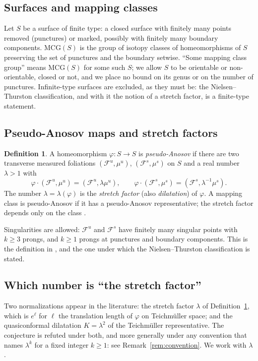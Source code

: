 \documentclass[11pt]{article}
\theoremstyle{plain}
\theoremstyle{definition}
\newtheorem{definition}[theorem]{Definition}
\theoremstyle{remark}
\newcommand{\Fu}{\mathcal{F}^{u}}
\newcommand{\Fs}{\mathcal{F}^{s}}
\begin{document}
\subsection{Surfaces and mapping classes}

Let $S$ be a surface of finite type: a closed surface with finitely many points
removed (punctures) or marked, possibly with finitely many boundary components.
$\mathrm{MCG}(S)$ is the group of isotopy classes of homeomorphisms of $S$
preserving the set of punctures and the boundary setwise. ``Some mapping class
group'' means $\mathrm{MCG}(S)$ for some such $S$; we allow $S$ to be orientable
or non-orientable, closed or not, and we place no bound on its genus or on the
number of punctures. Infinite-type surfaces are excluded, as they must be: the
Nielsen--Thurston classification, and with it the notion of a stretch factor, is a
finite-type statement.

\subsection{Pseudo-Anosov maps and stretch factors}

\begin{definition}\label{def:pa}
A homeomorphism $\varphi\colon S\to S$ is \emph{pseudo-Anosov} if there are two
transverse measured foliations $(\Fu,\mu^{u})$, $(\Fs,\mu^{s})$ on $S$ and a real
number $\lambda>1$ with
\[
  \varphi\cdot(\Fu,\mu^{u})=(\Fu,\lambda\mu^{u}),
  \qquad
  \varphi\cdot(\Fs,\mu^{s})=(\Fs,\lambda^{-1}\mu^{s}).
\]
The number $\lambda=\lambda(\varphi)$ is the \emph{stretch factor} (also
\emph{dilatation}) of $\varphi$. A mapping class is pseudo-Anosov if it has a
pseudo-Anosov representative; the stretch factor depends only on the class
\cite{FLP,FM}.
\end{definition}

Singularities are allowed: $\Fu$ and $\Fs$ have finitely many singular points with
$k\ge3$ prongs, and $k\ge1$ prongs at punctures and boundary components. This is
the definition in \cite{FLP,FM,Thurston88}, and the one under which the
Nielsen--Thurston classification is stated.

\subsection{Which number is ``the stretch factor''}\label{sec:convention}

Two normalizations appear in the literature: the stretch factor $\lambda$ of
Definition~\ref{def:pa}, which is $e^{\ell}$ for $\ell$ the translation length of
$\varphi$ on Teichmüller space; and the quasiconformal dilatation $K=\lambda^{2}$
of the Teichmüller representative. The conjecture is refuted under both, and more
generally under any convention that names $\lambda^{k}$ for a fixed integer
$k\ge1$: see Remark~\ref{rem:convention}. We work with $\lambda$.
\end{document}

